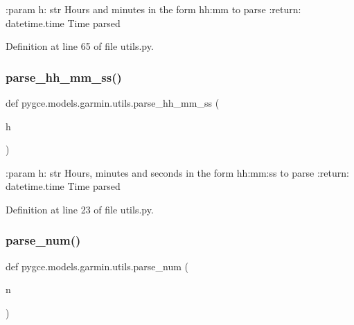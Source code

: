 \begin{DoxyVerb}:param h: str
    Hours and minutes in the form hh:mm to parse
:return: datetime.time
    Time parsed
\end{DoxyVerb}
 

Definition at line 65 of file utils.\+py.

\mbox{\label{namespacepygce_1_1models_1_1garmin_1_1utils_ac75c05f5427172ce319c6ff155399b17}} 
\subsubsection{\texorpdfstring{parse\+\_\+hh\+\_\+mm\+\_\+ss()}{parse\_hh\_mm\_ss()}}
{\footnotesize\ttfamily def pygce.\+models.\+garmin.\+utils.\+parse\+\_\+hh\+\_\+mm\+\_\+ss (\begin{DoxyParamCaption}\item[{}]{h }\end{DoxyParamCaption})}

\begin{DoxyVerb}:param h: str
    Hours, minutes and seconds in the form hh:mm:ss to parse
:return: datetime.time
    Time parsed
\end{DoxyVerb}
 

Definition at line 23 of file utils.\+py.

\mbox{\label{namespacepygce_1_1models_1_1garmin_1_1utils_aea0d8725a78fd92ca64024c3c1c0c184}} 
\subsubsection{\texorpdfstring{parse\+\_\+num()}{parse\_num()}}
{\footnotesize\ttfamily def pygce.\+models.\+garmin.\+utils.\+parse\+\_\+num (\begin{DoxyParamCaption}\item[{}]{n }\end{DoxyParamCaption})}

